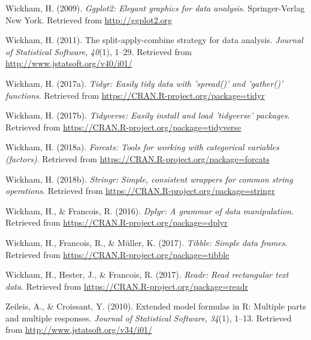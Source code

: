 \documentclass[english,man]{apa6}
\theoremstyle{definition}
\theoremstyle{definition}
\theoremstyle{definition}
\theoremstyle{remark}
\begin{document}
\hypertarget{ref-R-ggplot2}{}
Wickham, H. (2009). \emph{Ggplot2: Elegant graphics for data analysis}.
Springer-Verlag New York. Retrieved from \url{http://ggplot2.org}

\hypertarget{ref-R-plyr}{}
Wickham, H. (2011). The split-apply-combine strategy for data analysis.
\emph{Journal of Statistical Software}, \emph{40}(1), 1--29. Retrieved
from \url{http://www.jstatsoft.org/v40/i01/}

\hypertarget{ref-R-tidyr}{}
Wickham, H. (2017a). \emph{Tidyr: Easily tidy data with 'spread()' and
'gather()' functions}. Retrieved from
\url{https://CRAN.R-project.org/package=tidyr}

\hypertarget{ref-R-tidyverse}{}
Wickham, H. (2017b). \emph{Tidyverse: Easily install and load
'tidyverse' packages}. Retrieved from
\url{https://CRAN.R-project.org/package=tidyverse}

\hypertarget{ref-R-forcats}{}
Wickham, H. (2018a). \emph{Forcats: Tools for working with categorical
variables (factors)}. Retrieved from
\url{https://CRAN.R-project.org/package=forcats}

\hypertarget{ref-R-stringr}{}
Wickham, H. (2018b). \emph{Stringr: Simple, consistent wrappers for
common string operations}. Retrieved from
\url{https://CRAN.R-project.org/package=stringr}

\hypertarget{ref-R-dplyr}{}
Wickham, H., \& Francois, R. (2016). \emph{Dplyr: A grammar of data
manipulation}. Retrieved from
\url{https://CRAN.R-project.org/package=dplyr}

\hypertarget{ref-R-tibble}{}
Wickham, H., Francois, R., \& Müller, K. (2017). \emph{Tibble: Simple
data frames}. Retrieved from
\url{https://CRAN.R-project.org/package=tibble}

\hypertarget{ref-R-readr}{}
Wickham, H., Hester, J., \& Francois, R. (2017). \emph{Readr: Read
rectangular text data}. Retrieved from
\url{https://CRAN.R-project.org/package=readr}

\hypertarget{ref-R-Formula}{}
Zeileis, A., \& Croissant, Y. (2010). Extended model formulas in R:
Multiple parts and multiple responses. \emph{Journal of Statistical
Software}, \emph{34}(1), 1--13. Retrieved from
\url{http://www.jstatsoft.org/v34/i01/}
\end{document}
